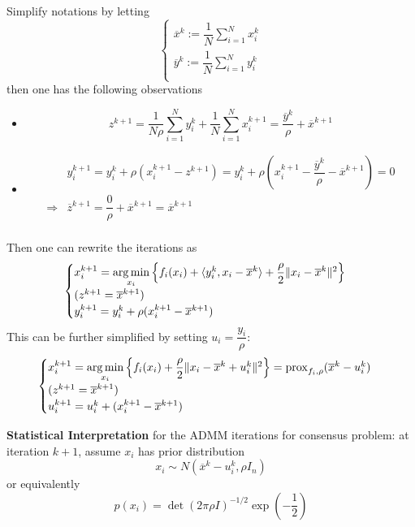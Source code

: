 Simplify notations by letting
$$
\begin{cases}
\overline{x}^k := \dfrac{1}{N} \sum\limits_{i=1}^N x_i^k \\
\overline{y}^k := \dfrac{1}{N} \sum\limits_{i=1}^N y_i^k \\
\end{cases}
$$
then one has the following observations
\begin{itemize}
    \item $$\displaystyle z^{k+1} = \dfrac{1}{N\rho} \sum\limits_{i=1}^N y_i^k + \dfrac{1}{N} \sum\limits_{i=1}^N x_i^{k+1} = \dfrac{\overline{y}^k}{\rho} + \overline{x}^{k+1}$$
    \item \begin{align*}
        & y^{k+1}_i = y_i^k + \rho(x_i^{k+1}-z^{k+1}) = y_i^k + \rho(x_i^{k+1}-\dfrac{\overline{y}^k}{\rho} - \overline{x}^{k+1}) = 0 \\
        \Rightarrow & \overline{z}^{k+1} = \dfrac{0}{\rho} + \overline{x}^{k+1} = \overline{x}^{k+1} \\
    \end{align*}
\end{itemize}
Then one can rewrite the iterations as
$$
\begin{cases}
x^{k+1}_i = \operatorname*{arg\,min}\limits_{x_i} \left\{ f_i(x_i) + \langle y_i^k, x_i-\overline{x}^k \rangle + \dfrac{\rho}{2}\lVert x_i-\overline{x}^k \rVert^2 \right\} \\
(z^{k+1} = \overline{x}^{k+1}) \\
y_i^{k+1} = y_i^k + \rho(x^{k+1}_i-\overline{x}^{k+1})
\end{cases}
$$
This can be further simplified by setting $u_i = \dfrac{y_i}{\rho}$:
$$
\begin{cases}
x^{k+1}_i = \operatorname*{arg\,min}\limits_{x_i} \left\{ f_i(x_i) + \dfrac{\rho}{2}\lVert x_i-\overline{x}^k + u_i^k \rVert^2 \right\} = \operatorname{prox}_{f_i,\rho}(\overline{x}^k - u_i^k) \\
(z^{k+1} = \overline{x}^{k+1}) \\
u_i^{k+1} = u_i^k + (x^{k+1}_i-\overline{x}^{k+1})
\end{cases}
$$

{\bfseries Statistical Interpretation} for the ADMM iterations for consensus problem: at iteration $k+1$, assume $x_i$ has prior distribution
$$x_i \sim N(\overline{x}^k-u_i^k, \rho I_n)$$
or equivalently
$$p(x_i) = \det(2\pi\rho I)^{-1/2} \exp\left(-\dfrac{1}{2} \right)$$



